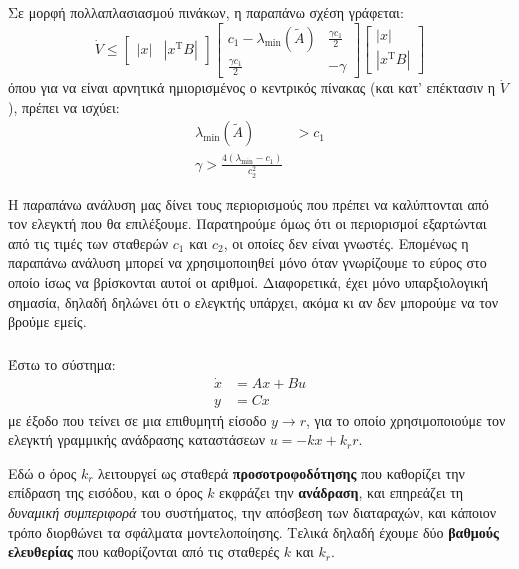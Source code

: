 \documentclass[11pt,a4paper,notitlepage,fleqn]{article}
\let\mytodo\todo
\renewcommand{\todo}[1]{\par\mytodo[inline,noline]{#1}}
\begin{document}
Σε μορφή πολλαπλασιασμού πινάκων, η παραπάνω σχέση γράφεται:
\[
\dot V \leq \left[\begin{matrix}
|x| & \left|x^{\mathrm T}B\right|
\end{matrix}\right]\left[\begin{matrix}
c_1 - \lambda_{\min}(\tilde A) & \frac{\gamma c_1}{2} \\
\frac{\gamma c_1}{2} & -\gamma
\end{matrix}\right]\left[\begin{matrix}
|x| \\ \left|x^{\mathrm T} B\right|
\end{matrix}\right]
\]
όπου για να είναι αρνητικά ημιορισμένος ο κεντρικός πίνακας (και κατ' επέκτασιν η \( \dot V \)), πρέπει να ισχύει:
\begin{align*}
	\lambda_{\min}(\tilde A) &> c_1 \\
	\gamma > \frac{4\left(\lambda_{\min} -c_1 \right)}{c_2^2}
\end{align*}

Η παραπάνω ανάλυση μας δίνει τους περιορισμούς που πρέπει να καλύπτονται από τον ελεγκτή που θα επιλέξουμε.
Παρατηρούμε όμως ότι οι περιορισμοί εξαρτώνται από τις τιμές των σταθερών \( c_1 \) και \( c_2 \), οι οποίες
δεν είναι γνωστές. Επομένως η παραπάνω ανάλυση μπορεί να χρησιμοποιηθεί μόνο όταν γνωρίζουμε το εύρος
στο οποίο ίσως να βρίσκονται αυτοί οι αριθμοί. Διαφορετικά, έχει μόνο υπαρξιολογική σημασία, δηλαδή δηλώνει
ότι ο ελεγκτής υπάρχει, ακόμα κι αν δεν μπορούμε να τον βρούμε εμείς.

\subsubsection{}
Έστω το σύστημα:
\begin{align*}
	\dot x &= Ax + Bu \\
	y &= Cx
\end{align*}
με έξοδο που τείνει σε μια επιθυμητή είσοδο \( y\to r \), για το οποίο χρησιμοποιούμε
τον ελεγκτή γραμμικής ανάδρασης καταστάσεων \( u=-kx + k_r r \).

\todo{Graph 40}

Εδώ ο όρος \( k_r \) λειτουργεί ως σταθερά \textbf{προσοτροφοδότησης}
που καθορίζει την επίδραση της εισόδου, και ο όρος \( k \) εκφράζει
την \textbf{ανάδραση}, και επηρεάζει τη \textit{δυναμική συμπεριφορά}
του συστήματος, την απόσβεση των διαταραχών, και κάποιον τρόπο
διορθώνει τα σφάλματα μοντελοποίησης. Τελικά δηλαδή έχουμε δύο \textbf{βαθμούς ελευθερίας} που καθορίζονται από τις σταθερές \( k \)
και \( k_r \).
\end{document}
